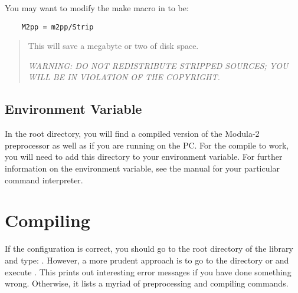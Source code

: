 \newpage
{}

    You may want to modify the make macro
     in  to be:
\begin{verbatim}
    M2pp = m2pp/Strip
\end{verbatim}
\begin{quote}
    This will
    save a megabyte or two of disk space.  
    
    {\em WARNING: DO NOT REDISTRIBUTE
    STRIPPED SOURCES; YOU WILL BE IN VIOLATION OF THE COPYRIGHT.}
\end{quote}   

\subsection{ Environment Variable}

In the root  directory, you will find a compiled version of
the Modula-2 preprocessor as well as  if you are running
on the PC.  For the compile to work, you will need to add this directory
to your  environment variable.  For further information on the
 environment variable,
see the manual for your particular
command interpreter.

\section{Compiling}

If the configuration is correct, you should go to the root
directory of the library and type: .  However, a more 
prudent approach is to go to the directory 
or  and execute .  This prints
out interesting error messages if you have done something wrong.
Otherwise, it lists a myriad of preprocessing and 
compiling commands.

